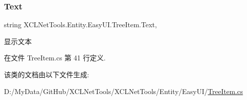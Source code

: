 \subsubsection{\texorpdfstring{Text}{Text}}
{\footnotesize\ttfamily string X\+C\+L\+Net\+Tools.\+Entity.\+Easy\+U\+I.\+Tree\+Item.\+Text\hspace{0.3cm}{\ttfamily [get]}, {\ttfamily [set]}}



显示文本 



在文件 Tree\+Item.\+cs 第 41 行定义.



该类的文档由以下文件生成\+:\begin{DoxyCompactItemize}
\item 
D\+:/\+My\+Data/\+Git\+Hub/\+X\+C\+L\+Net\+Tools/\+X\+C\+L\+Net\+Tools/\+Entity/\+Easy\+U\+I/\hyperlink{_tree_item_8cs}{Tree\+Item.\+cs}\end{DoxyCompactItemize}
